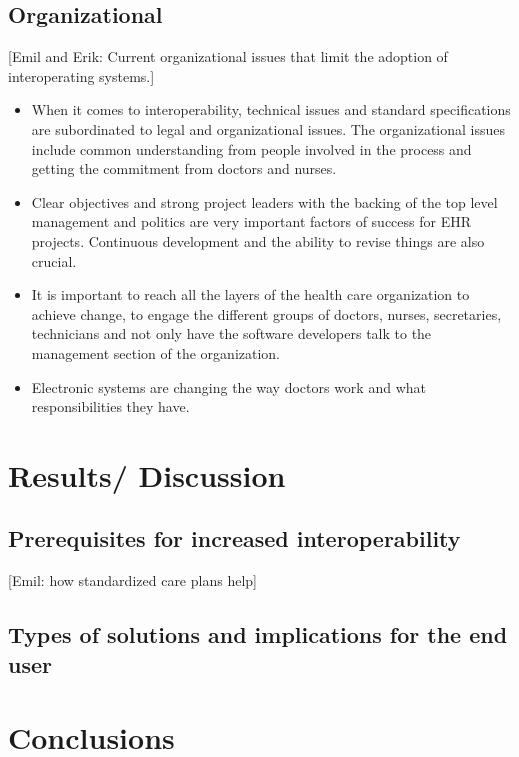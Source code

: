 \documentclass[14pt]{article}
\begin{document}
\subsection{Organizational}

[Emil and Erik: Current organizational issues that limit the adoption of interoperating systems.]

\begin{itemize}
\item When it comes to \gls{interoperability}, technical issues and standard specifications are subordinated to legal and organizational issues. The organizational issues include common understanding from people involved in the process and getting the commitment from doctors and nurses. 
\item Clear objectives and strong project leaders with the backing of the top level management and politics are very important factors of success for \gls{EHR} projects. Continuous development and the ability to revise things are also crucial.
\item It is important to reach all the layers of the health care organization to achieve change, to engage the different groups of doctors, nurses, secretaries, technicians and not only have the software developers talk to the management section of the organization.
\item Electronic systems are changing the way doctors work and what responsibilities they have.
\end{itemize}

\newpage

\section{Results/ Discussion}

\subsection{Prerequisites for increased interoperability}

[Emil: how standardized care plans help]

\subsection{Types of solutions and implications for the end user}

\newpage

\section{Conclusions}


\newpage

\begin{appendix}


\end{appendix}

\newpage

 
 
\end{document}
